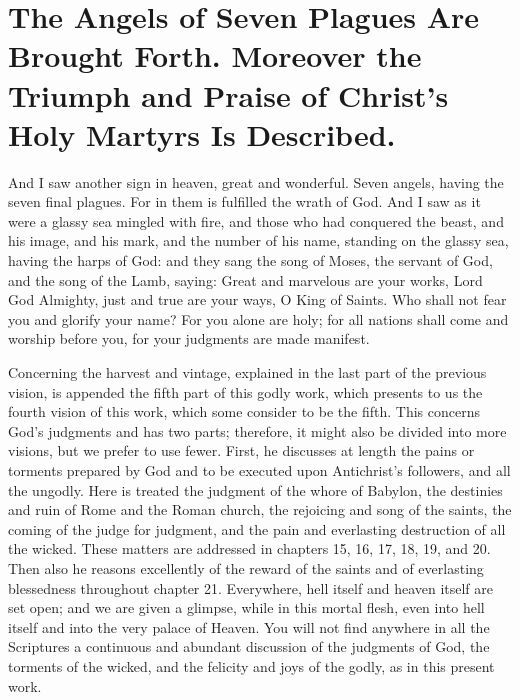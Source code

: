 \chapter[Sermon 67. The Angels of Seven Plagues Are Brought Forth. Moreover the Triumph and Praise of Christ's Holy Martyrs Is Described.]{The Angels of Seven Plagues Are Brought Forth. Moreover the Triumph and Praise of Christ's Holy Martyrs Is Described.}
\label{sermon:067}

And I saw another sign in heaven, great and wonderful. Seven angels, having the seven final plagues. For in them is fulfilled the wrath of God. And I saw as it were a glassy sea mingled with fire, and those who had conquered the beast, and his image, and his mark, and the number of his name, standing on the glassy sea, having the harps of God: and they sang the song of Moses, the servant of God, and the song of the Lamb, saying: Great and marvelous are your works, Lord God Almighty, just and true are your ways, O King of Saints. Who shall not fear you and glorify your name? For you alone are holy; for all nations shall come and worship before you, for your judgments are made manifest.

Concerning the harvest and vintage, explained in the last part of the previous vision, is appended the fifth part of this godly work, which presents to us the fourth vision of this work, which some consider to be the fifth. This concerns God’s judgments and has two parts; therefore, it might also be divided into more visions, but we prefer to use fewer. First, he discusses at length the pains or torments prepared by God and to be executed upon Antichrist’s followers, and all the ungodly. Here is treated the judgment of the whore of Babylon, the destinies and ruin of Rome and the Roman church, the rejoicing and song of the saints, the coming of the judge for judgment, and the pain and everlasting destruction of all the wicked. These matters are addressed in chapters 15, 16, 17, 18, 19, and 20. Then also he reasons excellently of the reward of the saints and of everlasting blessedness throughout chapter 21. Everywhere, hell itself and heaven itself are set open; and we are given a glimpse, while in this mortal flesh, even into hell itself and into the very palace of Heaven. You will not find anywhere in all the Scriptures a continuous and abundant discussion of the judgments of God, the torments of the wicked, and the felicity and joys of the godly, as in this present work.

